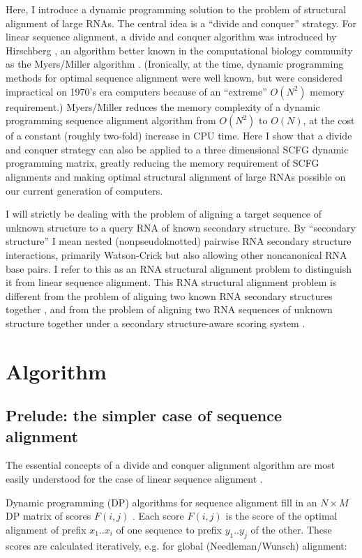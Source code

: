 \documentclass[11pt]{article}
\begin{document}
Here, I introduce a dynamic programming solution to the problem of
structural alignment of large RNAs. The central idea is a ``divide and
conquer'' strategy. For linear sequence alignment, a divide and
conquer algorithm was introduced by Hirschberg \cite{Hirschberg75}, an
algorithm better known in the computational biology community as the
Myers/Miller algorithm \cite{MyM-88a}. (Ironically, at the time,
dynamic programming methods for optimal sequence alignment were well
known, but were considered impractical on 1970's era computers because
of an ``extreme'' $O(N^2)$ memory requirement.) Myers/Miller reduces
the memory complexity of a dynamic programming sequence alignment
algorithm from $O(N^2)$ to $O(N)$, at the cost of a constant (roughly
two-fold) increase in CPU time. Here I show that a divide and conquer
strategy can also be applied to a three dimensional SCFG dynamic
programming matrix, greatly reducing the memory requirement of SCFG
alignments and making optimal structural alignment of large RNAs
possible on our current generation of computers.

I will strictly be dealing with the problem of aligning a target
sequence of unknown structure to a query RNA of known secondary
structure. By ``secondary structure'' I mean nested (nonpseudoknotted)
pairwise RNA secondary structure interactions, primarily Watson-Crick
but also allowing other noncanonical RNA base pairs. I refer to this
as an RNA structural alignment problem to distinguish it from linear
sequence alignment. This RNA structural alignment problem is different
from the problem of aligning two known RNA secondary structures
together \cite{Shapiro90}, and from the problem of aligning two RNA
sequences of unknown structure together under a secondary
structure-aware scoring system
\cite{Sankoff85,Gorodkin01,MathewsTurner02}.

\section{Algorithm}

\subsection{Prelude: the simpler case of sequence alignment}

The essential concepts of a divide and conquer alignment algorithm are
most easily understood for the case of linear sequence alignment
\cite{Hirschberg75,MyM-88a}.

Dynamic programming (DP) algorithms for sequence alignment fill in an
$N \times M$ DP matrix of scores $F(i,j)$
\cite{Needleman70,Smith81}. Each score $F(i,j)$ is the score of the
optimal alignment of prefix $x_1..x_i$ of one sequence to prefix
$y_1..y_j$ of the other. These scores are calculated iteratively, e.g.
for global (Needleman/Wunsch) alignment:
\end{document}
